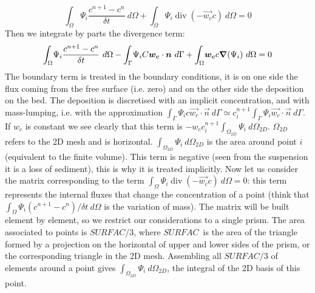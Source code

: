 \begin{equation}%
{\displaystyle\int\nolimits_{\Omega}}
\Psi_{i}\dfrac{c^{n+1}-c^{n}}{\delta t}~d\Omega+%
{\displaystyle\int\nolimits_{\Omega}}
\Psi_{i}\operatorname{div}(-\vec{w_{c}}c)~d\Omega=0
\end{equation}
Then we integrate by parts the divergence term:%
\begin{equation}%
{\displaystyle\int\nolimits_{\Omega}}
\Psi_{i}\dfrac{c^{n+1}-c^{n}}{\delta t}~d\Omega-%
{\displaystyle\int\nolimits_{\Gamma}}
\Psi_{i}C\vec{w_{c}}\cdot\vec{n}~d\Gamma+%
{\displaystyle\int\nolimits_{\Omega}}
\vec{w_{c}}c\Grad(\Psi_{i}%
)~d\Omega=0
\end{equation}
The boundary term is treated in the boundary conditions, it is on one side the
flux coming from the free surface (i.e. zero) and on the other side the
deposition on the bed. The deposition is discretised with an implicit
concentration, and with mass-lumping, i.e. with the approximation
${\displaystyle\int\nolimits_{\Gamma}}
\Psi_{i}c\vec{w_{c}}\cdot\vec{n}~d\Gamma\simeq c_{i}^{n+1}%
{\displaystyle\int\nolimits_{\Gamma}}
\Psi_{i}\vec{w_{c}}\cdot\vec{n}~d\Gamma$.
If $w_{c}$ is constant we see clearly that this term is
$-w_{c}c_{i}^{n+1}{\displaystyle\int\nolimits_{\Omega_{2D}}}\Psi_{i}~d\Omega_{2D}$.
$\Omega_{2D}$ refers to the 2D mesh and is horizontal.
${\displaystyle\int\nolimits_{\Omega_{2D}}}\Psi_{i}~d\Omega_{2D}$
is the area around point $i$ (equivalent to the finite
volume). This term is negative (seen from the suspension it is a loss of
sediment), this is why it is treated implicitly.
Now let us consider the matrix corresponding to the term
${\displaystyle\int\nolimits_{\Omega}}\Psi_{i}\operatorname{div}(-\vec{w_{c}}c)~d\Omega=0$:
this term represents the internal fluxes that change the concentration of a
point (think that ${\int_{\Omega}}\Psi_{i}(c^{n+1}-c^{n})/\delta t~d\Omega$ is the variation of mass).
The matrix will be built element by element, so we restrict our considerations to a single prism.
The area associated to points is $SURFAC/3$, where $SURFAC$\ is the area of
the triangle formed by a projection on the horizontal of upper and lower sides
of the prism, or the corresponding triangle in the 2D mesh. Assembling all
$SURFAC/3$ of elements around a point gives ${\displaystyle\int\nolimits_{\Omega_{2D}}}\Psi_{i}~d\Omega_{2D}$,
the integral of the 2D basis of this point.%

